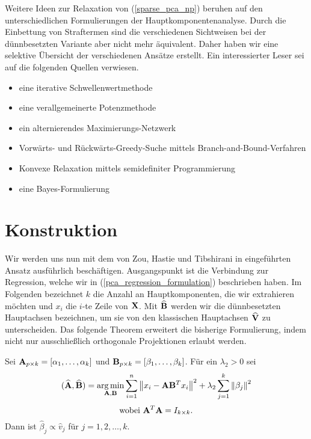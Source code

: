 Weitere Ideen zur Relaxation von (\ref{sparse_pca_np}) beruhen auf den unterschiedlichen Formulierungen der Hauptkomponentenanalyse. Durch die Einbettung von Straftermen sind die verschiedenen Sichtweisen bei der dünnbesetzten Variante aber nicht mehr äquivalent. Daher haben wir eine selektive Übersicht der verschiedenen Ansätze erstellt. Ein interessierter Leser sei auf die folgenden Quellen verwiesen.
\begin{itemize}
\item eine iterative Schwellenwertmethode \cite{shen, witten}
\item eine verallgemeinerte Potenzmethode \cite{journee}
\item ein alternierendes Maximierungs-Netzwerk \cite{richtarik}
\item Vorwärts- und Rückwärts-Greedy-Suche mittels Branch-and-Bound-Verfahren \cite{moghaddam}
\item Konvexe Relaxation mittels semidefiniter Programmierung \cite{daspremont_semidefinite}
\item eine Bayes-Formulierung \cite{guan}
\end{itemize}




\section{Konstruktion}
\label{construction}

Wir werden uns nun mit dem von Zou, Hastie und Tibshirani in \cite{zou_sparsepca} eingeführten Ansatz ausführlich beschäftigen. Ausgangspunkt ist die Verbindung zur Regression, welche wir in (\ref{pca_regression_formulation}) beschrieben haben. Im Folgenden bezeichnet $k$ die Anzahl an Hauptkomponenten, die wir extrahieren möchten und $x_i$ die $i$-te Zeile von $\mathbf{X}$. Mit $\widehat{\mathbf{B}}$ werden wir die dünnbesetzten Hauptachsen bezeichnen, um sie von den klassischen Hauptachsen $\widehat{\mathbf{V}}$ zu unterscheiden. Das folgende Theorem erweitert die bisherige Formulierung, indem nicht nur ausschließlich orthogonale Projektionen erlaubt werden. 

\begin{thm} \label{pca_regression_formulation_ridge}
Sei $\mathbf{A}_{p \times k} = [ \alpha_1, \ldots ,\alpha_k ]$ und $\mathbf{B}_{p \times k} = [ \beta_1, \ldots ,\beta_k ]$. Für ein $\lambda_2 > 0$ sei
$$(\widehat{\mathbf{A}}, \widehat{\mathbf{B}}) = \operatorname*{arg\,min}_{\mathbf{A}, \mathbf{B}} \sum_{i=1}^{n} \left\lVert x_i - \mathbf{A}\mathbf{B}^Tx_i \right\rVert^2 + \lambda_2 \sum_{j=1}^{k}\left\lVert \beta_j \right\rVert^2$$
$$\text{wobei } \mathbf{A}^T\mathbf{A} = I_{k \times k}.$$
Dann ist $\widehat{\beta}_j \propto \widehat{v}_j$ für $j = 1,2,\ldots,k$. 
\end{thm}

